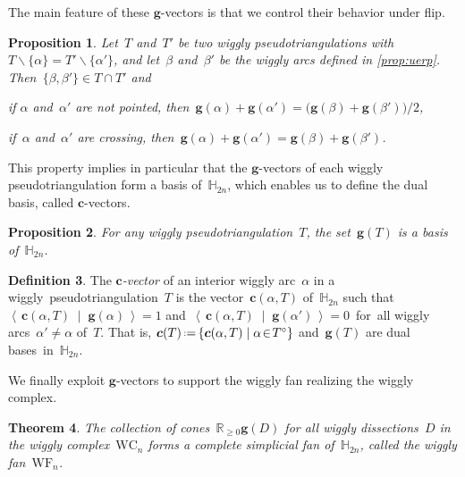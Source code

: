 \documentclass[submission]{FPSAC2025}
\newtheorem{theorem}{Theorem}%
\newtheorem{proposition}[theorem]{Proposition}
\theoremstyle{definition}
\newtheorem{definition}[theorem]{Definition}
\newcommand{\R}{\mathbb{R}} %
\newcommand{\HH}{\mathbb{H}} %
\renewcommand{\b}[1]{{\boldsymbol{#1}}} %
\newcommand{\set}[2]{\left\{ #1 \;\middle|\; #2 \right\}} %
\newcommand{\ssm}{\smallsetminus} %
\newcommand{\dotprod}[2]{\left\langle \, #1 \; \middle| \; #2 \, \right\rangle} %
\newcommand{\eqdef}{\mbox{\,\raisebox{0.2ex}{\scriptsize\ensuremath{\mathrm:}}\ensuremath{=}\,}} %
\newcommand{\darkblue}{\color{darkblue}} %
\newcommand{\defn}[1]{\textsl{\darkblue #1}} %
\newcommand{\wigglyComplex}{\mathrm{WC}} %
\newcommand{\wigglyFan}{\mathrm{WF}} %
\begin{document}
The main feature of these $\b{g}$-vectors is that we control their behavior under flip.

\begin{proposition}
\label{prop:linearDependences}
Let~$T$ and~$T'$ be two wiggly pseudotriangulations with~$T \ssm \{\alpha\} = T' \ssm \{\alpha'\}$, and let~$\beta$ and~$\beta'$ be the wiggly arcs defined in \cref{prop:uerp}.
Then~$\{\beta, \beta'\} \in T \cap T'$ and
\begin{compactitem}
\item if $\alpha$ and~$\alpha'$ are not pointed, then~$\b{g}(\alpha) + \b{g}(\alpha') = \big( \b{g}(\beta) + \b{g}(\beta') \big) / 2$,
\item if~$\alpha$ and~$\alpha'$ are crossing, then~${\b{g}(\alpha) + \b{g}(\alpha') = \b{g}(\beta) + \b{g}(\beta')}$.
\end{compactitem}
\end{proposition}

This property implies in particular that the $\b{g}$-vectors of each wiggly pseudotriangulation form a basis of~$\HH_{2n}$, which enables us to define the dual basis, called $\b{c}$-vectors.

\begin{proposition}
\label{prop:basis}
For any wiggly pseudotriangulation~$T$, the set~$\b{g}(T)$ is a basis of~$\HH_{2n}$.
\end{proposition}

\begin{definition}
\label{def:cvectors}
The \defn{$\b{c}$-vector} of an interior wiggly arc~$\alpha$ in a \mbox{wiggly pseudotriangulation~$T$} is the vector~$\b{c}(\alpha, T)$ of~$\HH_{2n}$ such that~$\dotprod{\b{c}(\alpha, T)\!}{\!\b{g}(\alpha)} \!=\! 1$ and~$\dotprod{\b{c}(\alpha, T)\!}{\!\b{g}(\alpha')} \!=\! 0$~for~all wiggly arcs~$\alpha' \ne \alpha$ of~$T$.
That is, $\b{c}(T) \eqdef \! \set{\b{c}(\alpha, T)}{\alpha \!\in\! T^\circ}$ and~$\b{g}(T)$ are dual bases~in~$\HH_{2n}$.
\end{definition}

We finally exploit $\b{g}$-vectors to support the wiggly fan realizing the wiggly complex.

\begin{theorem}
\label{thm:wigglyFan}
The collection of cones~$\R_{\ge 0} \b{g}(D) $ for all wiggly dissections~$D$ in the wiggly complex~$\wigglyComplex_n$ forms a complete simplicial fan of~$\HH_{2n}$, called the \defn{wiggly fan}~$\wigglyFan_n$.
\end{theorem}
\end{document}
